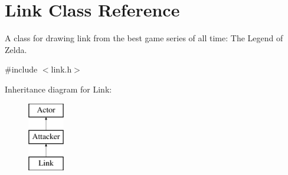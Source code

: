 \hypertarget{classLink}{}\section{Link Class Reference}
\label{classLink}


A class for drawing link from the best game series of all time\+: The Legend of Zelda.  




{\ttfamily \#include $<$link.\+h$>$}

Inheritance diagram for Link\+:\begin{figure}[H]
\begin{center}
\leavevmode
\includegraphics[height=3.000000cm]{classLink}
\end{center}
\end{figure}
